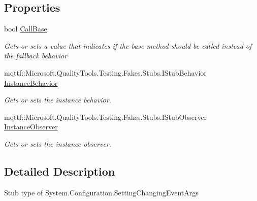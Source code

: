 \subsection*{Properties}
\begin{DoxyCompactItemize}
\item 
bool \hyperlink{class_system_1_1_configuration_1_1_fakes_1_1_stub_setting_changing_event_args_ae09949c3576fd3002a1e1b3122bc10f7}{Call\-Base}
\begin{DoxyCompactList}\small\item\em Gets or sets a value that indicates if the base method should be called instead of the fallback behavior\end{DoxyCompactList}\item 
mqttf\-::\-Microsoft.\-Quality\-Tools.\-Testing.\-Fakes.\-Stubs.\-I\-Stub\-Behavior \hyperlink{class_system_1_1_configuration_1_1_fakes_1_1_stub_setting_changing_event_args_a30e506c45d1b8bff9cba42921ec242ce}{Instance\-Behavior}
\begin{DoxyCompactList}\small\item\em Gets or sets the instance behavior.\end{DoxyCompactList}\item 
mqttf\-::\-Microsoft.\-Quality\-Tools.\-Testing.\-Fakes.\-Stubs.\-I\-Stub\-Observer \hyperlink{class_system_1_1_configuration_1_1_fakes_1_1_stub_setting_changing_event_args_a3831387e4f33666c18425c5ed127d87e}{Instance\-Observer}
\begin{DoxyCompactList}\small\item\em Gets or sets the instance observer.\end{DoxyCompactList}\end{DoxyCompactItemize}


\subsection{Detailed Description}
Stub type of System.\-Configuration.\-Setting\-Changing\-Event\-Args



